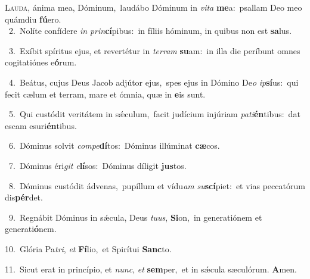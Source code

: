 \lettrine{\initial\textcolor{\initialcolor}{L}}{auda,} ánima mea, Dóminum,~\dagger laudábo Dóminum in \textit{vi}\-\textit{ta} \textbf{me}\-a:~\star psallam Deo meo quámdiu \textbf{fú}\-ero.\\
{\numbfont\textcolor{\numbcolor}{~2.}}~Nolíte confídere \textit{in} \textit{prin}\-\textbf{cí}pibus:~\star in fíliis hóminum, in quibus non est \textbf{sa}\-lus.\par
{\numbfont\textcolor{\numbcolor}{~3.}}~Exíbit spíritus ejus, et revertétur in \textit{ter}\-\textit{ram} \textbf{su}\-am:~\star in illa die períbunt omnes cogitatiónes e\-\textbf{ó}\-rum.\par
{\numbfont\textcolor{\numbcolor}{~4.}}~Beátus, cujus Deus Jacob adjútor ejus,~\dagger spes ejus in Dómino De\textit{o} \textit{ip}\-\textbf{sí}us:~\star qui fecit cælum et terram, mare et ómnia, quæ in \textbf{e}\-is sunt.\par
{\numbfont\textcolor{\numbcolor}{~5.}}~Qui custódit veritátem in sǽculum,~\dagger facit judícium injúriam \textit{pa}\-\textit{ti}\textbf{én}tibus:~\star dat escam esuri\-\textbf{én}\-tibus.\par
{\numbfont\textcolor{\numbcolor}{~6.}}~Dóminus solvit \textit{com}\-\textit{pe}\textbf{dí}tos:~\star Dóminus illúminat \textbf{cæ}\-cos.\par
{\numbfont\textcolor{\numbcolor}{~7.}}~Dóminus éri\textit{git} \textit{e}\-\textbf{lí}sos:~\star Dóminus díligit \textbf{jus}\-tos.\par
{\numbfont\textcolor{\numbcolor}{~8.}}~Dóminus custódit ádvenas,~\dagger pupíllum et vídu\textit{am} \textit{su}\-\textbf{scí}piet:~\star et vias peccatórum dis\-\textbf{pér}\-det.\par
{\numbfont\textcolor{\numbcolor}{~9.}}~Regnábit Dóminus in sǽcula, Deus \textit{tu}\-\textit{us}, \textbf{Si}\-on,~\star in generatiónem et generati\-\textbf{ó}\-nem.\par
{\numbfont\textcolor{\numbcolor}{10.}}~Glória Pa\-\textit{tri}\-, \textit{et} \textbf{Fí}\-lio,~\star et Spirítui \textbf{Sanc}\-to.\par
{\numbfont\textcolor{\numbcolor}{11.}}~Sicut erat in princípio, et \textit{nunc}\-, \textit{et} \textbf{sem}\-per,~\star et in sǽcula sæculórum. \textbf{A}\-men.\par
